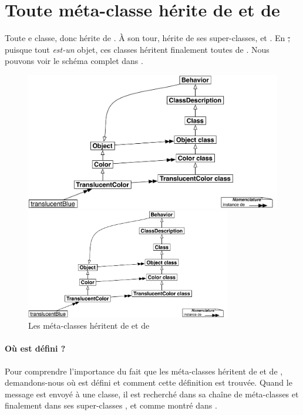 \documentclass[a4paper,10pt,twoside]{book}
\begin{document}
\section{Toute m{\'e}ta-classe h{\'e}rite de  et de }

Toute  e classe, donc hérite de .
À son tour,  hérite de ses super-classes,  et .
En \st, puisque tout \emph{est-un} objet, ces classes héritent finalement toutes de .
Nous pouvons voir le schéma complet dans .

\begin{center}
\begin{figure}
\ifluluelse
	{\centerline{\includegraphics[width=\textwidth]{TranslucentBehavior}}}
	{\centerline{\includegraphics[width=0.8\textwidth]{TranslucentBehavior}}}
\caption{Les méta-classes héritent de  et de \label{fig:inheritbehavior}}
\end{figure}
\end{center}


\paragraph{Où est défini ?}
Pour comprendre l'importance du fait que les méta-classes héritent de  et de , 
demandons-nous
où est défini  et comment cette définition est trouvée.
Quand le message  est envoyé à une classe, il est recherché dans sa chaîne de méta-classes et finalement dans ses super-classes ,  et  comme montré dans .
\end{document}
